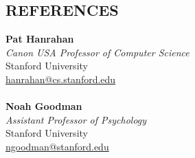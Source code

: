 \documentclass[line,margin]{res}
\begin{document}
\begin{resume}
\section{REFERENCES}

\textbf{Pat Hanrahan} \\
\emph{Canon USA Professor of Computer Science} \\
Stanford University  \\
\url{hanrahan@cs.stanford.edu}
\\ \\
\textbf{Noah Goodman} \\
\emph{Assistant Professor of Psychology} \\
Stanford University  \\
\url{ngoodman@stanford.edu}

\end{resume}
\end{document}
